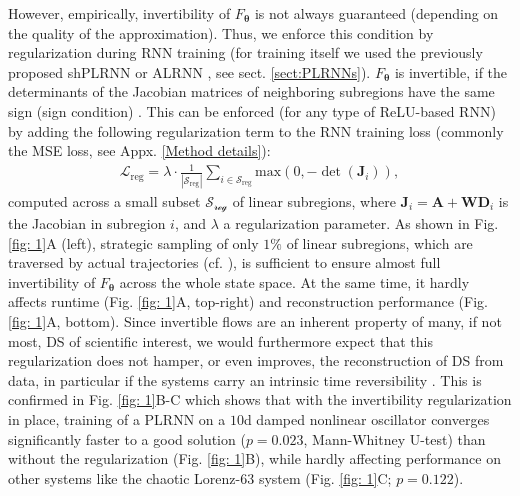 \documentclass{article}
\theoremstyle{example}
\theoremstyle{plain}
\theoremstyle{definition}
\theoremstyle{remark}
\def\mA{{\bm{A}}}
\def\mD{{\bm{D}}}
\def\mJ{{\bm{J}}}
\def\mW{{\bm{W}}}
\begin{document}
However, empirically, invertibility of $F_{\mathbf{\theta}}$ is not always guaranteed (depending on the quality of the approximation). Thus, we enforce this condition by regularization during RNN training (for training itself we used the previously proposed shPLRNN \citep{hess} or ALRNN \citep{brenner2024alrnn}, see sect. \ref{sect:PLRNNs}). $F_{\mathbf{\theta}}$ is invertible, if the determinants of the Jacobian matrices of neighboring subregions have the same sign (sign condition) \citep{fuji}. This can be enforced (for any type of ReLU-based RNN) by adding the following regularization term to the RNN training loss (commonly the MSE loss, see Appx. \ref{Method details}):
\begin{align}
\label{eq:Regularization}
\mathcal{L}_{\text{reg}} = \lambda \cdot \frac{1}{|\mathcal{S}_\text{reg}|} \sum_{i \in \mathcal{S}_\text{reg}} \text{max}\left(0,-\det(\mJ_i)\right) ,
\end{align}
computed across a small subset $\mathcal{S_\text{reg}}$ of linear subregions, where $\mJ_i=\mA + \mW \mD_i $ is the Jacobian in subregion $i$, and $\lambda$ a regularization parameter. As shown in Fig. \ref{fig: 1}A (left), strategic sampling of only $1\%$ of linear subregions, which are traversed by actual trajectories (cf. \citep{brenner2024alrnn}), is sufficient to ensure almost full invertibility of $F_{\mathbf{\theta}}$ across the whole state space. At the same time, it hardly affects runtime (Fig. \ref{fig: 1}A, top-right) and reconstruction performance (Fig. \ref{fig: 1}A, bottom). 
Since invertible flows are an inherent property of many, if not most, DS of scientific interest, we would furthermore expect that this regularization does not hamper, or even improves, the reconstruction of DS from data, in particular if the systems carry an intrinsic time reversibility %
\citep{huh2020time}. This is confirmed in Fig. \ref{fig: 1}B-C which shows that with the invertibility regularization in place, training of a PLRNN on a $10$d damped nonlinear %
oscillator converges significantly faster to a good solution ($p=0.023$, Mann-Whitney U-test) than without the regularization (Fig. \ref{fig: 1}B), while hardly affecting performance on other systems like the chaotic Lorenz-63 \citep{lorenz1963deterministic} system (Fig. \ref{fig: 1}C; $p=0.122$).
\end{document}
